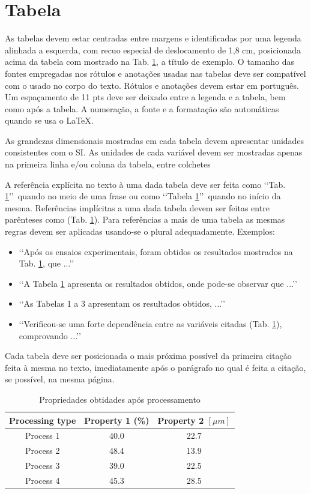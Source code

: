 \section{Tabela}

As tabelas devem estar centradas entre margens e identificadas por uma legenda
alinhada a esquerda, com recuo especial de deslocamento de 1,8 cm, posicionada
acima da tabela com mostrado na Tab. \ref{tab01}, a título de
exemplo. O tamanho das fontes empregadas nos rótulos e anotações usadas nas
tabelas deve ser compatível com o usado no corpo do texto. Rótulos e anotações
devem estar em português. Um espaçamento de 11 pts deve ser deixado entre a
legenda e a tabela, bem como após a tabela. A numeração, a fonte e a formatação
são automáticas quando se usa o \LaTeX.

As grandezas dimensionais mostradas em cada tabela devem apresentar unidades
consistentes com o SI. As unidades de cada variável devem ser mostradas apenas
na primeira linha e/ou coluna da tabela, entre colchetes

A referência explícita no texto à uma dada tabela deve ser feita como
\lq\lq Tab. \ref{tab01}\rq\rq\ quando no meio de uma frase ou como
\lq\lq Tabela \ref{tab01}\rq\rq\ quando no início da mesma. Referências
implícitas a uma dada tabela devem ser feitas entre parênteses como
(Tab. \ref{tab01}). Para referências a mais de uma tabela as mesmas
regras devem ser aplicadas usando-se o plural adequadamente. Exemplos:
\begin{itemize}
	\item \lq\lq Após os ensaios experimentais, foram obtidos os resultados
	mostrados na Tab. \ref{tab01}, que ...\rq\rq
	\item \lq\lq A Tabela \ref{tab01} apresenta os resultados obtidos, onde
	pode-se observar que ...\rq\rq
	\item \lq\lq As Tabelas 1 a 3 apresentam os resultados obtidos, ...\rq\rq
	\item \lq\lq Verificou-se uma forte dependência entre as variáveis citadas
	(Tab. \ref{tab01}), comprovando ...\rq\rq
\end{itemize}

Cada tabela deve ser posicionada o mais próxima possível da primeira citação
feita à mesma no texto, imediatamente após o parágrafo no qual é feita a
citação, se possível, na mesma página.

\begin{table}[h]
	\centering
	\caption{Propriedades obtidades após processamento}
	\label{tab01}

	\begin{tabular}{ccc}
		\toprule
		\textbf{Processing type} & \textbf{Property 1} (\%) &
		\textbf{Property 2} $[\mu m]$ \\
		\midrule
		Process 1 & 40.0 & 22.7 \\
		Process 2 & 48.4 & 13.9 \\
		Process 3 & 39.0 & 22.5 \\
		Process 4 & 45.3 & 28.5 \\
		\bottomrule
	\end{tabular}
\end{table}

